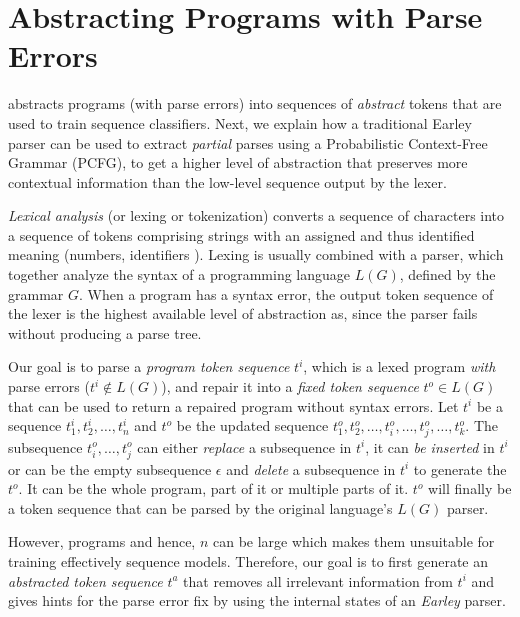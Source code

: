 
\newcommand{\ccount}{\mathit{count}}

\section{Abstracting Programs with Parse Errors}
\label{sec:prog-abstract}

\toolname abstracts programs (with parse errors) into sequences
of \emph{abstract} tokens that are used to train sequence classifiers.
Next, we explain how a traditional Earley parser can be used to extract
\emph{partial} parses using a Probabilistic Context-Free Grammar (PCFG),
to get a higher level of abstraction that preserves more contextual
information than the low-level sequence output by the lexer.



%
\emph{Lexical analysis} (or lexing or tokenization) converts
a sequence of characters into a sequence of tokens comprising
strings with an assigned and thus identified meaning (\eg numbers,
identifiers \etc).
%
Lexing is usually combined with a parser, which together analyze
the syntax of a programming language $L(G)$, defined by the grammar $G$.
%
When a program has a syntax error, the output token sequence of the
lexer is the highest available level of abstraction as, since the
parser fails without producing a parse tree.

%
Our goal is to parse a \emph{program token sequence} $t^i$, which is a lexed
program \emph{with} parse errors (\ie $t^i \notin L(G)$), and repair it into a
\emph{fixed token sequence} $t^o \in L(G)$ that can be used to return a repaired
program without syntax errors. Let $t^i$ be a sequence $t^i_1, t^i_2, \dots,
t^i_n$ and $t^o$ be the updated sequence $t^o_1, t^o_2, \dots, t^o_i, \dots,
t^o_j, \dots, t^o_k$. The subsequence $t^o_i, \dots, t^o_j$ can either
\emph{replace} a subsequence in $t^i$, it can \emph{be inserted} in $t^i$ or can
be the empty subsequence $\epsilon$ and \emph{delete} a subsequence
in $t^i$ to generate the $t^o$. It can be the whole program, part of it or
multiple parts of it. $t^o$ will finally be a token sequence that can be parsed
by the original language's $L(G)$ parser.

However, programs and hence, $n$ can be large which makes
them unsuitable for training effectively sequence models.
Therefore, our goal is to first generate an \emph{abstracted token sequence}
$t^a$ that removes all irrelevant information from $t^i$
and gives hints for the parse error fix by using the
internal states of an \emph{Earley} parser.


